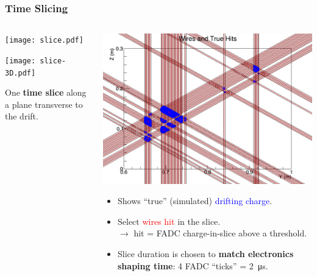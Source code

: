 \documentclass[xcolor=dvipsnames]{beamer}
\begin{document}
\begin{frame}[fragile]
  \frametitle{Time Slicing}
  
  \begin{columns}
    \begin{column}{0.35\textwidth}
      \begin{center}
        \vspace{-.5cm}

        \texttt{[image: slice.pdf]}

        \vspace{-2cm}

        \texttt{[image: slice-3D.pdf]}

        \scriptsize One \textbf{time slice} along a plane transverse to the drift.
      \end{center}
    \end{column}
    \begin{column}{0.65\textwidth}

      \includegraphics[width=\textwidth]{wires-and-true-hits.png}

      \begin{itemize} \scriptsize
      \item Shows ``true'' (simulated) \textcolor{blue}{drifting charge}.
      \item Select \textcolor{red}{wires hit} in the slice.\\
        $\rightarrow$ hit = FADC charge-in-slice above a threshold.
      \item Slice duration is chosen to \textbf{match
          electronics shaping time}: 4 FADC ``ticks'' =
        \SI{2}{\micro\second}.
      \end{itemize}
    \end{column}
  \end{columns}

\end{frame}
\end{document}
